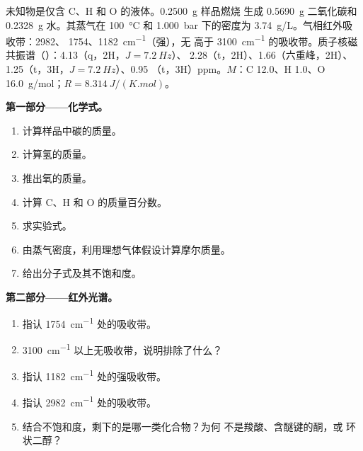 \begin{problem}
\label{pb:b1:structure-spectroscopy:1}
未知物是仅含 C、H 和 O 的液体。\qty{0.2500}{g} 样品燃烧
生成 \qty{0.5690}{g} 二氧化碳和
\qty{0.2328}{g} 水。其蒸气在
\qty{100}{\celsius} 和 \qty{1.000}{bar} 下的密度为 \qty{3.74}{g/L}。气相红外吸收带：2982、
1754、\qty{1182}{cm^{-1}}（强），无
高于 \qty{3100}{cm^{-1}} 的吸收带。质子核磁共振谱（）：4.13（q，2H，$J = \qty{7.2}{Hz}$）、
2.28（t，2H）、1.66（六重峰，2H）、1.25（t，3H，$J = \qty{7.2}{Hz}$）、0.95
（t，3H）ppm。$M$：C 12.0、H 1.0、O \qty{16.0}{g/mol}；$R =
\qty{8.314}{J/(K.mol)}$。

\begin{center}
\end{center}

\medskip
\noindent\textbf{第一部分——化学式。}
\begin{enumerate}
  \item 计算样品中碳的质量。
  \item 计算氢的质量。
  \item 推出氧的质量。
  \item 计算 C、H 和 O 的质量百分数。
  \item 求实验式。
  \item 由蒸气密度，利用理想气体假设计算摩尔质量。
  \item 给出分子式及其不饱和度。
\end{enumerate}

\medskip
\noindent\textbf{第二部分——红外光谱。}
\begin{enumerate}[resume]
  \item 指认 \qty{1754}{cm^{-1}} 处的吸收带。
  \item \qty{3100}{cm^{-1}} 以上无吸收带，说明排除了什么？
  \item 指认 \qty{1182}{cm^{-1}} 处的强吸收带。
  \item 指认 \qty{2982}{cm^{-1}} 处的吸收带。
  \item 结合不饱和度，剩下的是哪一类化合物？为何
        不是羧酸、含醚键的酮，或
        环状二醇？
\end{enumerate}


\end{problem}
